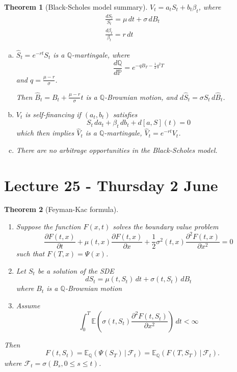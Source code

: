 \documentclass[10pt, oneside, reqno]{amsart}
\theoremstyle{plain}%
\newtheorem{thm}{Theorem}[section]
\theoremstyle{definition}
\theoremstyle{remark}
\newcommand{\given}{ \, | \,}
\newcommand{\Q}{\mathbb{Q}}
\renewcommand{\P}{\mathbb{P}}
\newcommand{\E}{\mathbb{E}}
\newcommand{\sigf}{\mathcal{F}}
\begin{document}
\begin{thm}[Black-Scholes model summary]
	$V_t = a_t S_t + b_t \beta_t$, where \begin{align*}
		\frac{dS_t}{S_t} = \mu \, dt + \sigma \, dB_t \\
		\frac{d\beta_t}{\beta_t} = r \, dt 
	\end{align*} 
	
	\begin{enumerate}[(a)]
		\item $\hat S_t = e^{-rt} S_t$ is a $\Q$-martingale, where \[
			\frac{d\Q}{d\P} = e^{-qB_T - \frac{1}{2} q^2 T}
		\] and $q = \frac{\mu - r}{\sigma}$.  
		
		Then $\hat B_t = B_t + \frac{\mu - r}{\sigma} t$ is a $\Q$-Brownian motion, and $d \hat S_t = \sigma \hat S_t \, d\hat B_t$.
		\item $V_t$ is self-financing if $(a_t, b_t)$ satisfies \[
			S_t \, da_t + \beta_t \, db_t + d[a, S](t) = 0
		\] which then implies $\hat V_t$ is a $\Q$-martingale, $\hat V_t = e^{-rt}V_t$.  		
		\item
		There are no arbitrage opportunities in the Black-Scholes model.
	\end{enumerate}
\end{thm}

\section{Lecture 25 - Thursday 2 June} %
\label{sec:lecture_25_thursday_2_june}
\begin{thm}[Feyman-Kac formula]{\ }
	\begin{enumerate}[(1)]
		\item Suppose the function $F(x, t)$ solves the boundary value problem \[
			\frac{\partial F(t, x)}{\partial t} + \mu(t, x) \frac{\partial F(t, x)}{\partial x} + \frac{1}{2} \sigma^2(t, x) \frac{\partial^2 F(t, x)}{\partial x^2} = 0
	\] such that $F(T, x) = \Psi(x)$.  
		\item Let $S_t$ be a solution of the SDE \[
			dS_t = \mu(t, S_t) \, dt + \sigma(t, S_t) \, dB_t \tag{$\star$}
		\] where $B_t$ is a $\Q$-Brownian motion
		\item Assume \[
			\int_0^T \E(\sigma(t, S_t) \frac{\partial^2 F(t, S_t)}{\partial x^2}) \, dt < \infty
		\]
	\end{enumerate} 
	
	Then \[
		F(t, S_t) = \E_\Q\left( \Psi(S_T) \given \sigf_t \right) = \E_\Q\left(F(T, S_T) \given \sigf_t \right).
	\] where $\sigf_t = \sigma(B_s, 0 \leq s \leq t)$. 
\end{thm}
\end{document}
